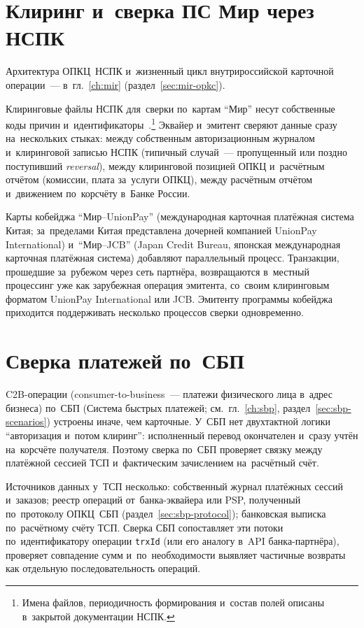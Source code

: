 \section{Клиринг и~сверка ПС Мир через НСПК}\label{sec:recon-mir}

Архитектура ОПКЦ~НСПК и~жизненный цикл внутрироссийской карточной операции~---
в~гл.~\ref{ch:mir} (раздел~\ref{sec:mir-opkc}).

Клиринговые файлы НСПК для~сверки по~картам \enquote{Мир} несут собственные
коды причин и~идентификаторы~\cite{nspk-mir-rules}.\footnote{Имена файлов, периодичность
формирования и~состав полей описаны в~закрытой документации НСПК.}
Эквайер и~эмитент сверяют данные сразу на~нескольких стыках: между
собственным авторизационным журналом и~клиринговой записью НСПК (типичный
случай~--- пропущенный или поздно поступивший \textit{reversal}), между
клиринговой позицией ОПКЦ и~расчётным отчётом (комиссии, плата за~услуги ОПКЦ),
между расчётным отчётом и~движением по~корсчёту в~Банке России.

Карты кобейджа \enquote{Мир--UnionPay} (международная карточная платёжная
  система Китая; за~пределами Китая представлена дочерней компанией UnionPay
International) и~\enquote{Мир--JCB} (Japan Credit Bureau, японская международная
карточная платёжная система) добавляют параллельный процесс. Транзакции,
прошедшие за~рубежом через сеть партнёра, возвращаются в~местный процессинг уже
как зарубежная операция эмитента, со~своим клиринговым форматом UnionPay
International или JCB. Эмитенту программы кобейджа приходится поддерживать
несколько процессов сверки одновременно.

\section{Сверка платежей по~СБП}\label{sec:recon-sbp}

C2B-операции (consumer-to-business~--- платежи физического лица в~адрес бизнеса)
по~СБП (Система быстрых платежей; см.~гл.~\ref{ch:sbp},
раздел~\ref{sec:sbp-scenarios}) устроены иначе, чем карточные.
У~СБП нет двухтактной логики \enquote{авторизация и~потом клиринг}: исполненный
перевод окончателен и~сразу учтён на~корсчёте получателя. Поэтому сверка по~СБП
проверяет связку между платёжной сессией ТСП и~фактическим зачислением
на~расчётный счёт.

Источников данных у~ТСП несколько: собственный журнал платёжных сессий
и~заказов; реестр операций от~банка-эквайера или PSP, полученный по~протоколу
ОПКЦ~СБП (раздел~\ref{sec:sbp-protocol}); банковская выписка по~расчётному счёту
ТСП. Сверка СБП сопоставляет эти потоки по~идентификатору операции \texttt{trxId}
(или его аналогу в~API банка-партнёра), проверяет совпадение сумм
и~по~необходимости выявляет частичные возвраты как отдельную последовательность операций.

